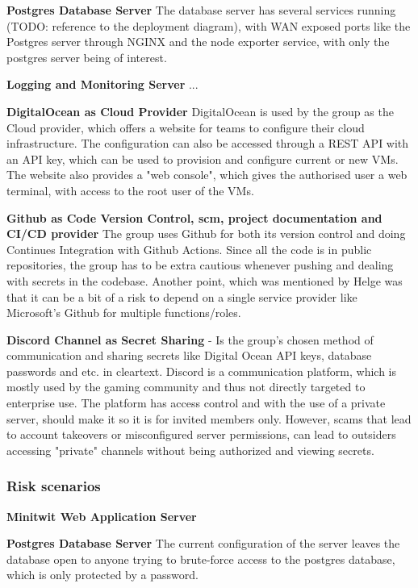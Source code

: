 \textbf{Postgres Database Server}
The database server has several services running (TODO: reference to the deployment diagram), with WAN exposed ports like the Postgres server through NGINX and the node exporter service, with only the postgres server being of interest.  

\textbf{Logging and Monitoring Server}
...

\textbf{DigitalOcean as Cloud Provider}
DigitalOcean is used by the group as the Cloud provider, which offers a website for teams to configure their cloud infrastructure. The configuration can also be accessed through a REST API with an API key, which can be used to provision and configure current or new VMs. The website also provides a "web console", which gives the authorised user a web terminal, with access to the root user of the VMs. 

\textbf{Github as Code Version Control, \acrshort{scm}, project documentation and CI/CD provider}
The group uses Github for both its version control and doing Continues Integration with Github Actions. Since all the code is in public repositories, the group has to be extra cautious whenever pushing and dealing with secrets in the codebase. Another point, which was mentioned by Helge was that it can be a bit of a risk to depend on a single service provider like Microsoft's Github for multiple functions/roles. 

\textbf{Discord Channel as Secret Sharing} - Is the group's chosen method of communication and sharing secrets like Digital Ocean API keys, database passwords and etc. in cleartext. Discord is a communication platform, which is mostly used by the gaming community and thus not directly targeted to enterprise use. The platform has access control and with the use of a private server, should make it so it is for invited members only. However, scams\cite{discord_privacy} that lead to account takeovers or misconfigured server permissions, can lead to outsiders accessing "private" channels without being authorized and viewing secrets.


\subsubsection{Risk scenarios}

\textbf{Minitwit Web Application Server}


\textbf{Postgres Database Server}
The current configuration of the server leaves the database open to anyone trying to brute-force access to the postgres database, which is only protected by a password.


